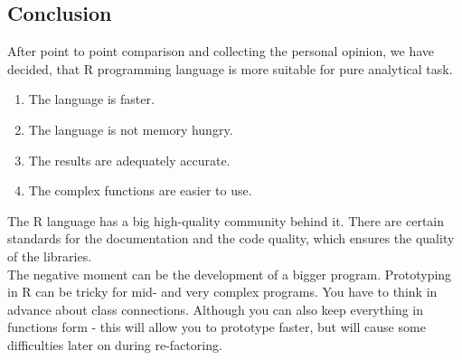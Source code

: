 \documentclass [twoside,
  11pt, a4paper,
  footinclude=true,
  headinclude=true,
  cleardoublepage=empty
]{article}
\begin{document}
\subsection{Conclusion}
After point to point comparison and collecting the personal opinion, we have decided, that R programming language is more suitable for pure analytical task.
\begin{enumerate}
    \item The language is faster.
    \item The language is not memory hungry.
    \item The results are adequately accurate. 
    \item The complex functions are easier to use.
\end{enumerate}
The R language has a big high-quality community behind it. There are certain standards for the documentation and the code quality, which ensures the quality of the libraries.\\
The negative moment can be the development of a bigger program. Prototyping in R can be tricky for mid- and very complex programs. You have to think in advance about class connections. Although you can also keep everything in functions form - this will allow you to prototype faster, but will cause some difficulties later on during re-factoring.\\
  

\newpage
\end{document}
